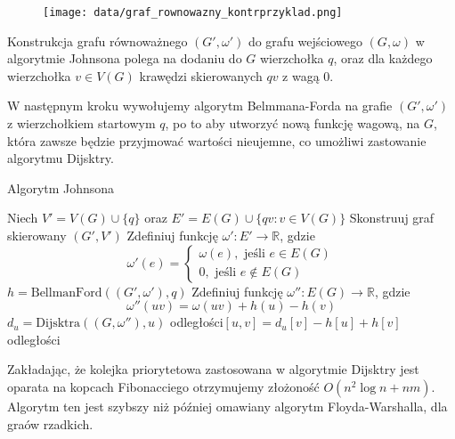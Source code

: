 \begin{figure}[H]
	\centering
	\texttt{[image: data/graf\_rownowazny\_kontrprzyklad.png]}
	\caption{  }
	\label{fig:kontrprzyklad_johnson}
\end{figure}

Konstrukcja grafu równoważnego $(G', \omega')$ 
do grafu wejściowego $(G, \omega)$
w algorytmie Johnsona polega na
dodaniu do $G$ wierzchołka $q$, oraz 
dla każdego wierzchołka $v \in V(G)$ krawędzi
skierowanych $qv$ z wagą 0. 

W następnym kroku wywołujemy algorytm Belmmana-Forda
na grafie $(G', \omega')$ z wierzchołkiem 
startowym $q$, po to aby utworzyć nową funkcję wagową,
na $G$, która zawsze będzie przyjmować wartości 
nieujemne, co umożliwi zastowanie 
algorytmu Dijsktry. 

\begin{algorithm}[H]
	\caption{Algorytm Johnsona}
	\begin{algorithmic}[1]
		\State Niech $V'=V(G) \cup \{q\}$ oraz 
		$E' = E(G) \cup \{qv : v \in V(G)\}$
		\State Skonstruuj graf skierowany $(G', V')$
		\State Zdefiniuj funkcję $\omega' : E' \to \mathbb{R}$, 
		gdzie 
		\[\omega'(e) = \begin{cases}
			\omega(e), \text{ jeśli } e \in E(G) \\
			0, \text{ jeśli }  e \not \in E(G)   
		\end{cases}\]
		\State $h = \text{BellmanFord}((G', \omega'), q)$
		\State Zdefiniuj funkcję $\omega'' : E(G) \to \mathbb{R}$, 
		gdzie 
		\[\omega''(uv) = \omega(uv) + h(u) - h(v)\]
		\State $d_u = \text{Dijsktra}((G, \omega''), u)$
		\State odległości$[u, v] = d_u[v] - h[u] + h[v]$
		\EndFor
		\EndFor
		\State \Return odległości
		\EndProcedure
	\end{algorithmic}
	\label{Johnson}
\end{algorithm}

Zakładając, że kolejka priorytetowa zastosowana 
w algorytmie Dijsktry jest oparata na kopcach 
Fibonacciego otrzymujemy złożoność $O(n^2\log n + nm)$. Algorytm 
ten jest szybszy niż później omawiany 
algorytm Floyda-Warshalla, dla graów rzadkich. 

